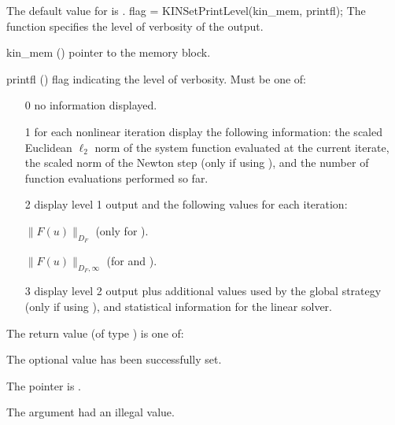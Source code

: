 {
  The default value for  is .
}
{
flag = KINSetPrintLevel(kin\_mem, printfl);
}
{
  The function  specifies the level of verbosity
  of the output.
}
{
  \begin{args}

  \item[kin\_mem] ()
    pointer to the {\kinsol} memory block.

  \item[printfl] ()
    flag indicating the level of verbosity. Must be one of:
    
    \begin{itemize}
    \item[0]
      no information displayed.
      
    \item[1]
      for each nonlinear iteration display
      the following information: the scaled
      Euclidean $\ell_2$ norm of the system function
      evaluated at the current iterate, the
      scaled norm of the Newton step (only if
      using ), and the
      number of function evaluations performed
      so far.
      
    \item[2]
      display level 1 output and the
      following values for each iteration:
      
      $\|F(u)\|_{D_F}$
      (only for ).
      
      $\|F(u)\|_{D_F,\infty}$
      (for  and
      ).
      
    \item[3]
      display level 2 output plus additional
      values used by the global strategy
      (only if using ), and
      statistical information for the linear
      solver.
    \end{itemize}

  \end{args}
}
{
  The return value  (of type ) is one of:
  \begin{args}
  \item[\Id{KIN\_SUCCESS}] 
    The optional value has been successfully set.
  \item[\Id{KIN\_MEM\_NULL}]
    The  pointer is .
  \item[\Id{KIN\_ILL\_INPUT}]
    The argument  had an illegal value.
  \end{args}
}
